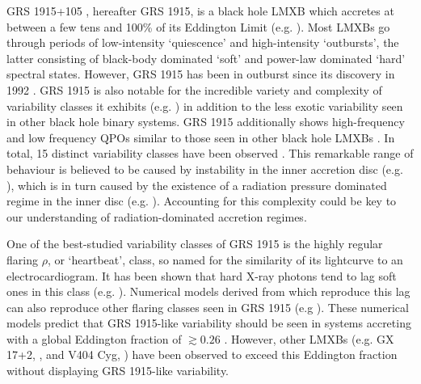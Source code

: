 \par  GRS 1915+105 \citep{CastroTirado_GRS1915}, hereafter GRS 1915, is a black hole LMXB which accretes at between a few tens and 100\% of its Eddington Limit (e.g. \citealp{Vilhu_SupEd,Done_GRS_HighAcc,Fender_DiskJet,Reid_Parallax}).  Most LMXBs go through periods of low-intensity `quiescence' and high-intensity `outbursts', the latter consisting of black-body dominated `soft' and power-law dominated `hard' spectral states.  However, GRS 1915 has been in outburst since its discovery in 1992 \citep{CastroTirado_GRS1915}.  GRS 1915 is also notable for the incredible variety and complexity of variability classes it exhibits (e.g. \citealp{Yadav_GRSBursts,Belloni_GRS_MI}) in addition to the less exotic variability seen in other black hole binary systems.  GRS 1915 additionally shows high-frequency and low frequency QPOs similar to those seen in other black hole LMXBs \citep{Morgan_QPO}.  In total, 15 distinct variability classes have been observed \citep{Belloni_GRS_MI,KleinWolt_OmegaClass,Hannikainen_NewClass, Pahari_NewClass}.  This remarkable range of behaviour is believed to be caused by instability in the inner accretion disc (e.g. \citealp{Janiuk_RadInstab,Nayakshin_GRSModel}), which is in turn caused by the existence of a radiation pressure dominated regime in the inner disc (e.g. \citealp{Done_GRS_HighAcc}).   Accounting for this complexity could be key to our understanding of radiation-dominated accretion regimes.
\par One of the best-studied variability classes of GRS 1915 is the highly regular flaring $\rho$, or `heartbeat', class, so named for the similarity of its lightcurve to an electrocardiogram. It has been shown that hard X-ray photons tend to lag soft ones in this class (e.g. \citealp{Janiuk_Lag,Massaro_Lag}).  Numerical models derived from \citealp{Shakura_Disk} which reproduce this lag can also reproduce other flaring classes seen in GRS 1915 (e.g \citealp{Nayakshin_GRSModel,Massaro_Numerical}).  These numerical models predict that GRS 1915-like variability should be seen in systems accreting with a global Eddington fraction of $\gtrsim0.26$ \citep{Nayakshin_GRSModel}.  However, other LMXBs (e.g. GX 17+2, \citealp{Kuulkers_GX17}, and V404 Cyg, \citealp{Huppenkothen_V404}) have been observed to exceed this Eddington fraction without displaying GRS 1915-like variability.
